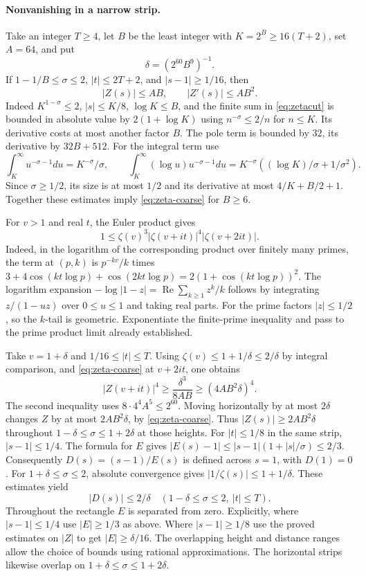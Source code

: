 \paragraph{Nonvanishing in a narrow strip.}
Take an integer $T\ge4$, let $B$ be the least integer with
$K=2^B\ge16(T+2)$, set $A=64$, and put
\[
                 \delta=(2^{60}B^9)^{-1}.
\]
If $1-1/B\le\sigma\le2$, $|t|\le2T+2$, and $|s-1|\ge1/16$,
then
\begin{equation}\label{eq:zeta-coarse}
                        |Z(s)|\le AB,\qquad |Z'(s)|\le AB^2 .
\end{equation}
Indeed $K^{1-\sigma}\le2$, $|s|\le K/8$, $\log K\le B$,
and the finite sum in \eqref{eq:zetacut} is bounded in absolute
value by $2(1+\log K)$ using $n^{-\sigma}\le2/n$ for $n\le K$.
Its derivative costs at most another factor $B$. The pole term is
bounded by $32$, its derivative by $32B+512$. For the integral term
use
\[
 \int_K^\infty u^{-\sigma-1}du=K^{-\sigma}/\sigma,\qquad
 \int_K^\infty (\log u)u^{-\sigma-1}du
       =K^{-\sigma}((\log K)/\sigma+1/\sigma^2).
\]
Since $\sigma\ge1/2$, its size is at most $1/2$ and its derivative
at most $4/K+B/2+1$. Together these estimates imply
\eqref{eq:zeta-coarse} for $B\ge6$.

For $v>1$ and real $t$, the Euler product gives
\[
          1\le \zeta(v)^3|\zeta(v+it)|^4|\zeta(v+2it)|.
\]
Indeed, in the logarithm of the corresponding product over finitely
many primes, the term at $(p,k)$ is $p^{-kv}/k$ times
$3+4\cos(kt\log p)+\cos(2kt\log p)
 =2(1+\cos(kt\log p))^2$. The logarithm expansion
$-\log|1-z|=\operatorname{Re}\sum_{k\ge1}z^k/k$ follows by
integrating $z/(1-uz)$ over $0\le u\le1$ and taking real parts.
For the prime factors $|z|\le1/2$, so the $k$-tail is geometric.
Exponentiate the finite-prime inequality and pass to the prime
product limit already established.

Take $v=1+\delta$ and $1/16\le |t|\le T$. Using
$\zeta(v)\le1+1/\delta\le2/\delta$ by integral comparison, and
\eqref{eq:zeta-coarse} at $v+2it$, one obtains
\[
       |Z(v+it)|^4\ge\frac{\delta^3}{8AB}
                      \ge (4AB^2\delta)^4.
\]
The second inequality uses $8\cdot4^4 A^5\le2^{60}$.
Moving horizontally by at most $2\delta$ changes $Z$ by at most
$2AB^2\delta$, by \eqref{eq:zeta-coarse}. Thus $|Z(s)|\ge2AB^2\delta$
throughout $1-\delta\le\sigma\le1+2\delta$ at those heights.
For $|t|\le1/8$ in the same strip, $|s-1|\le1/4$.
The formula for $E$ gives
$|E(s)-1|\le |s-1|(1+|s|/\sigma)\le2/3$.
Consequently $D(s)=(s-1)/E(s)$ is defined across $s=1$, with
$D(1)=0$. For $1+\delta\le\sigma\le2$, absolute convergence gives
$|1/\zeta(s)|\le1+1/\delta$. These estimates yield
\begin{equation}\label{eq:recip-strip}
              |D(s)|\le 2/\delta \quad
          (1-\delta\le\sigma\le2,\ |t|\le T).
\end{equation}
Throughout the rectangle $E$ is separated from zero. Explicitly, where
$|s-1|\le1/4$ use $|E|\ge1/3$ as above. Where $|s-1|\ge1/8$
use the proved estimates on $|Z|$ to get $|E|\ge\delta/16$.
The overlapping height and distance ranges allow the choice of
bounds using rational approximations. The horizontal strips likewise overlap on
$1+\delta\le\sigma\le1+2\delta$.

